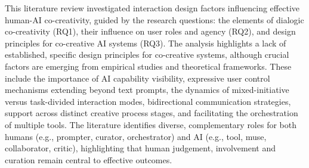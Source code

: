 This literature review investigated interaction design factors influencing effective human-AI co-creativity, guided by the research questions: the elements of dialogic co-creativity (RQ1), their influence on user roles and agency (RQ2), and design principles for co-creative AI systems (RQ3). The analysis highlights a lack of established, specific design principles for co-creative systems, although crucial factors are emerging from empirical studies and theoretical frameworks. These include the importance of AI capability visibility, expressive user control mechanisms extending beyond text prompts, the dynamics of mixed-initiative versus task-divided interaction modes, bidirectional communication strategies, support across distinct creative process stages, and facilitating the orchestration of multiple tools. The literature identifies diverse, complementary roles for both humans (e.g., prompter, curator, orchestrator) and AI (e.g., tool, muse, collaborator, critic), highlighting that human judgement, involvement and curation remain central to effective outcomes. 

